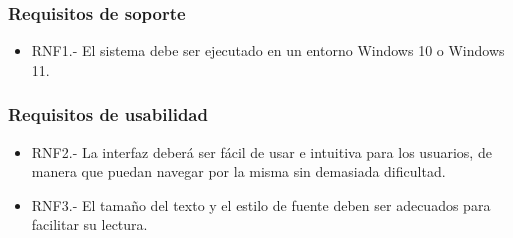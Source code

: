 \subsubsection{Requisitos de soporte}

\begin{itemize}
    \item RNF1.- El sistema debe ser ejecutado en un entorno Windows 10 o Windows 11.
\end{itemize}

\subsubsection{Requisitos de usabilidad}

\begin{itemize}
    \item RNF2.- La interfaz deberá ser fácil de usar e intuitiva para los usuarios, de manera que puedan navegar por la misma sin demasiada dificultad.
    \item RNF3.- El tamaño del texto y el estilo de fuente deben ser adecuados para facilitar su lectura.
\end{itemize}